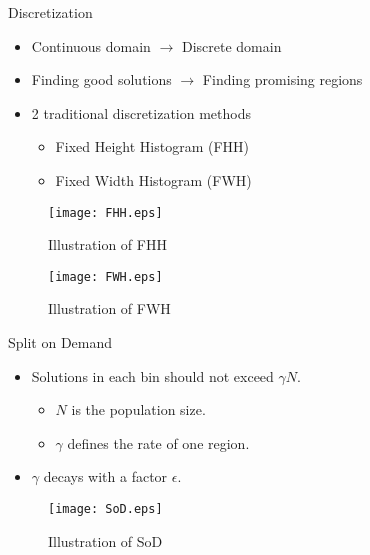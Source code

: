 \begin{frame}{Discretization} 
  \begin{itemize} 
    \item Continuous domain $\rightarrow$ Discrete domain 
    \item Finding good solutions $\rightarrow$ Finding promising
      regions
    \item 2 traditional discretization methods
      \begin{itemize}
        \item Fixed Height Histogram (FHH)
        \item Fixed Width Histogram (FWH)
      \end{itemize}
      \vspace*{2pt}
  \end{itemize}
  \begin{minipage}{.45\textwidth}
    \begin{figure}
      \centering
      \texttt{[image: FHH.eps]}
      \caption{Illustration of FHH}
    \end{figure}
  \end{minipage}
  \begin{minipage}{.45\textwidth}
    \begin{figure}
      \centering
      \texttt{[image: FWH.eps]}
      \caption{Illustration of FWH}
    \end{figure}
  \end{minipage}

\end{frame}

\begin{frame}{Split on Demand}
  \begin{itemize}
    \item Solutions in each bin should not exceed $\gamma N$.
      \begin{itemize}
        \item $N$ is the population size.
        \item $\gamma$ defines the rate of one region.
      \end{itemize}
    \item $\gamma$ decays with a factor $\epsilon$.
  \end{itemize}
  \hspace{-9cm}
  \vspace*{-0.5cm}
      \begin{figure}[h]
      \texttt{[image: SoD.eps]}
        \caption{Illustration of SoD}
      \end{figure}
\end{frame}

